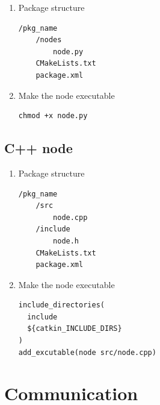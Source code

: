             \begin{enumerate}
                \item Package structure
\begin{verbatim}
/pkg_name
    /nodes
        node.py
    CMakeLists.txt
    package.xml
\end{verbatim}
            \item Make the node executable
\begin{verbatim}
chmod +x node.py
\end{verbatim}

            \end{enumerate}


        \subsection{C++ node}
            \begin{enumerate}
                \item Package structure
\begin{verbatim}
/pkg_name
    /src
        node.cpp
    /include
        node.h
    CMakeLists.txt
    package.xml
\end{verbatim}
            \item Make the node executable
\begin{verbatim}
include_directories(
  include 
  ${catkin_INCLUDE_DIRS}
)
add_excutable(node src/node.cpp)
\end{verbatim}

            \end{enumerate}





    \section{Communication}


